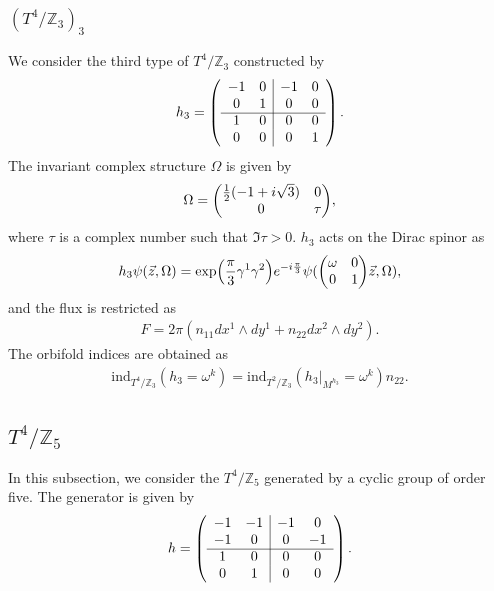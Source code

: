 \documentclass[11pt]{article}
\begin{document}
\subsubsection{$(T^4/ \mathbb{Z}_3)_3$}
We consider the third type of $T^4/ \mathbb{Z}_3$ constructed by
\begin{align}
h_3=\left(\begin{array}{cc|cc}
-1 & 0 & -1 & 0 \\ 
0 & 1 & 0 & 0 \\ \cline{1-4}
1 &0 &0 & 0 \\
0 & 0 & 0 & 1  
\end{array}\right).
\end{align}
The invariant complex structure $\Omega$ is given by
\begin{align}
    \Omega= \mqty( \frac{1}{2}(-1 +i \sqrt{3}) & 0 \\ 0 & \tau),
\end{align}
where $\tau$ is a complex number such that $\Im \tau>0$. $h_3$ acts on the Dirac spinor as
\begin{align}
    h_3 \psi(\vec{z},\Omega)= \exp(\frac{\pi}{3} \gamma^1 \gamma^2) e^{-i\frac{\pi}{3}} \psi( \mqty(\omega & 0\\ 0& 1)\vec{z},\Omega ),
\end{align}
and the flux is restricted as
\begin{align}
    F= 2\pi(n_{11} dx^1 \wedge dy^1 + n_{22} dx^2 \wedge dy^2 ).
\end{align}
The orbifold indices are obtained as
\begin{align}
    \text{ind}_{T^4/\mathbb{Z}_3}(h_3= \omega^k)=\text{ind}_{T^2/\mathbb{Z}_3 }(h_3 |_{M^{h_3} }=\omega^k )n_{22}.
\end{align}

\subsection{$T^4/ \mathbb{Z}_5$}
In this subsection, we consider the $T^4/ \mathbb{Z}_5$ generated by a cyclic group of order five. The generator is given by
\begin{align}
    h=\left(\begin{array}{cc|cc}
-1 & -1 & -1 & 0 \\ 
-1 & 0 & 0 & -1 \\ \cline{1-4}
1 &0 &0 & 0 \\
0 & 1 & 0 & 0  
\end{array}\right).
\end{align}
\end{document}
